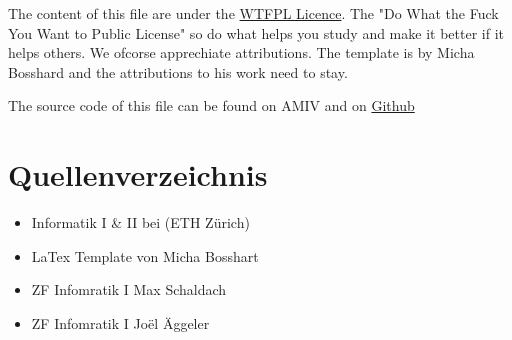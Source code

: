 \begin{center}
   The content of this file are under the \href{http://www.wtfpl.net/}{WTFPL Licence}. The  "Do What the Fuck You Want to Public License" so do what helps you study and make it better if it helps others. We ofcorse apprechiate attributions.
   The template is by Micha Bosshard and the attributions to his work need to stay.


   The source code of this file can be found on AMIV and on \href{}{Github}
   
   
\end{center}

\section{Quellenverzeichnis}

\begin{itemize}
    \item Informatik I \& II bei  (ETH Zürich)
    \item LaTex Template von Micha Bosshart
    \item ZF Infomratik I Max Schaldach
    \item ZF Infomratik I Joël Äggeler
\end{itemize}
